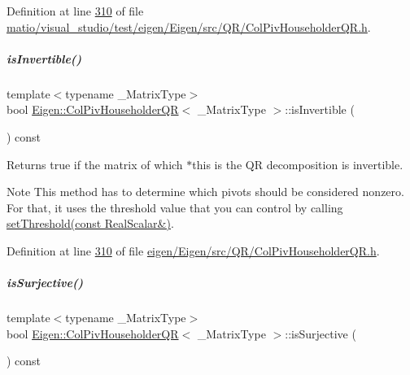 Definition at line \hyperlink{matio_2visual__studio_2test_2eigen_2_eigen_2src_2_q_r_2_col_piv_householder_q_r_8h_source_l00310}{310} of file \hyperlink{matio_2visual__studio_2test_2eigen_2_eigen_2src_2_q_r_2_col_piv_householder_q_r_8h_source}{matio/visual\+\_\+studio/test/eigen/\+Eigen/src/\+Q\+R/\+Col\+Piv\+Householder\+Q\+R.\+h}.

\mbox{\label{group___q_r___module_a945720f8d683f8ebe97fa807edd3142a}} 
\subparagraph{\texorpdfstring{is\+Invertible()}{isInvertible()}\hspace{0.1cm}{\footnotesize\ttfamily [2/2]}}
{\footnotesize\ttfamily template$<$typename \+\_\+\+Matrix\+Type$>$ \\
bool \hyperlink{group___q_r___module_class_eigen_1_1_col_piv_householder_q_r}{Eigen\+::\+Col\+Piv\+Householder\+QR}$<$ \+\_\+\+Matrix\+Type $>$\+::is\+Invertible (\begin{DoxyParamCaption}{ }\end{DoxyParamCaption}) const\hspace{0.3cm}{\ttfamily [inline]}}

\begin{DoxyReturn}{Returns}
true if the matrix of which $\ast$this is the QR decomposition is invertible.
\end{DoxyReturn}
\begin{DoxyNote}{Note}
This method has to determine which pivots should be considered nonzero. For that, it uses the threshold value that you can control by calling \hyperlink{group___q_r___module_ae712cdc9f0e521cfc8061bee58ff55ee}{set\+Threshold(const Real\+Scalar\&)}. 
\end{DoxyNote}


Definition at line \hyperlink{eigen_2_eigen_2src_2_q_r_2_col_piv_householder_q_r_8h_source_l00310}{310} of file \hyperlink{eigen_2_eigen_2src_2_q_r_2_col_piv_householder_q_r_8h_source}{eigen/\+Eigen/src/\+Q\+R/\+Col\+Piv\+Householder\+Q\+R.\+h}.

\mbox{\label{group___q_r___module_a87a7d06e0b0479e5b56b19c2a4f56365}} 
\subparagraph{\texorpdfstring{is\+Surjective()}{isSurjective()}\hspace{0.1cm}{\footnotesize\ttfamily [1/2]}}
{\footnotesize\ttfamily template$<$typename \+\_\+\+Matrix\+Type$>$ \\
bool \hyperlink{group___q_r___module_class_eigen_1_1_col_piv_householder_q_r}{Eigen\+::\+Col\+Piv\+Householder\+QR}$<$ \+\_\+\+Matrix\+Type $>$\+::is\+Surjective (\begin{DoxyParamCaption}{ }\end{DoxyParamCaption}) const\hspace{0.3cm}{\ttfamily [inline]}}

